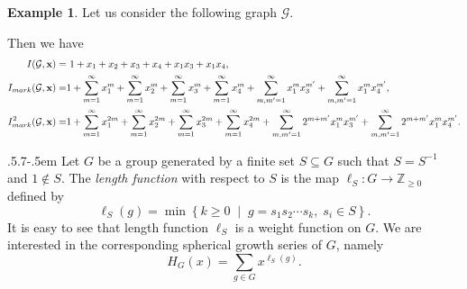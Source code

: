 \documentclass[11pt,reqno]{amsart}
\makeatletter
\numberwithin{equation}{section} %
\theoremstyle{definition}
\newtheorem{example}{Example}
\theoremstyle{remark}
\numberwithin{equation}{section}
\def\subsection{\def\@secnumfont{\bfseries}\@startsection{subsection}{2}%
  {\parindent}{.5\linespacing\@plus.7\linespacing}{-.5em}%
  {\normalfont\bfseries}}
\makeatother
\begin{document}
\medskip
\begin{example}
Let us consider the following graph $\mathcal{G}$.
\begin{figure}[h]
\centering
\begin{subfigure}{0.49\textwidth}
\centering
\end{subfigure}
\end{figure}

Then we have 
\begin{align*}
    I(\mathcal{G}, \bold x)  = & \ 1+x_1+x_2+x_3+x_4+x_1x_3+x_1x_4,\\
    I_{mark}(\mathcal{G},\mathbf{x}) = & 1+\sum_{m=1}^{\infty}x_1^m+\sum_{m=1}^{\infty}x_2^m+\sum_{m=1}^{\infty}x_3^m+\sum_{m=1}^{\infty}x_4^m+\sum_{m, m'=1}^{\infty}x_1^mx_3^{m'}+\sum_{m, m'=1}^{\infty}x_1^mx_4^{m'},\\
    I^2_{mark}(\mathcal{G},\mathbf{x}) = & 1+\sum_{m=1}^{\infty}x_1^{2m}+\sum_{m=1}^{\infty}x_2^{2m}+\sum_{m=1}^{\infty}x_3^{2m}+\sum_{m=1}^{\infty}x_4^{2m}+\sum_{m, m'=1}^{\infty}2^{m+m'}x_1^{m}x_3^{m'}+\sum_{m, m'=1}^{\infty}2^{m+m'}x_1^{m}x_4^{m'}.
\end{align*}
\end{example}

\subsection{}  
Let \(G\) be a group generated by a finite set $S\subseteq G$ such that 
$S=S^{-1}$ and $1\notin S.$ The \emph{length function} with respect to \(S\) is the map
$\ell_S:G\longrightarrow \mathbb{Z}_{\ge 0}$
defined by
\[
\ell_S(g)
=
\min\left\{
k\ge 0
\;\middle|\;
g=s_1s_2\cdots s_k,\;
s_i\in S
\right\}.
\]
It is easy to see that length function $\ell_S$ is a weight function on $G$. We are interested in the corresponding spherical growth series of $G$, namely
$$H_G(x) =  \sum_{g\in G} x^{\ell_S(g)}. $$
\end{document}
